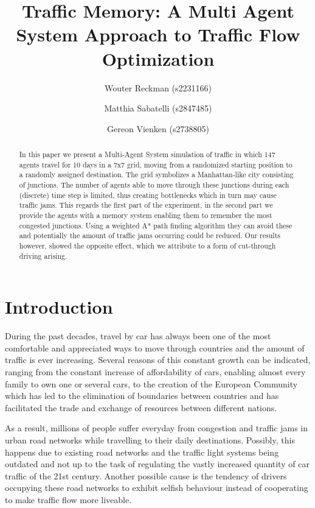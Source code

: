 \documentclass[a4paper,hidelinks]{article}
\title{\textbf{\huge Traffic Memory: A Multi Agent System Approach to Traffic Flow Optimization}%
}
\author{
	Wouter Reckman (s2231166) \and
    Matthia Sabatelli (s2847485) \and
    Gereon Vienken (s2738805) 
}
\date{}
\begin{document}
\ttl
\thispagestyle{empty}

%


\begin{abstract}
\noindent
In this paper we present a Multi-Agent System simulation of traffic in which 147 agents travel for 10 days in a 7x7 grid, moving from a randomized starting position to a randomly assigned destination. The grid symbolizes a Manhattan-like city consisting of junctions. The number of agents able to move through these junctions during each (discrete) time step is limited, thus creating bottlenecks which in turn may cause traffic jams. This regards the first part of the experiment, in the second part we provide the agents with a memory system enabling them to remember the most congested junctions. Using a weighted A* path finding algorithm they can avoid these and potentially the amount of traffic jams occurring could be reduced. Our results however, showed the opposite effect, which we attribute to a form of cut-through driving arising.
\end{abstract}


\section{Introduction}
During the past decades, travel by car has always been one of the most comfortable and appreciated ways to move through countries and the amount of traffic is ever increasing. Several reasons of this constant growth can be indicated, ranging from the constant increase of affordability of cars, enabling almost every family to own one or several cars, to the creation of the European Community which has led to the elimination of boundaries between countries and has facilitated the trade and exchange of resources between different nations.

As a result, millions of people suffer everyday from congestion and traffic jams in urban road networks while travelling to their daily destinations. Possibly, this happens due to existing road networks and the traffic light systems being outdated and not up to the task of regulating the vastly increased quantity of car traffic of the 21st century. Another possible cause is the tendency of drivers occupying these road networks to exhibit selfish behaviour instead of cooperating to make traffic flow more liveable.
\end{document}
